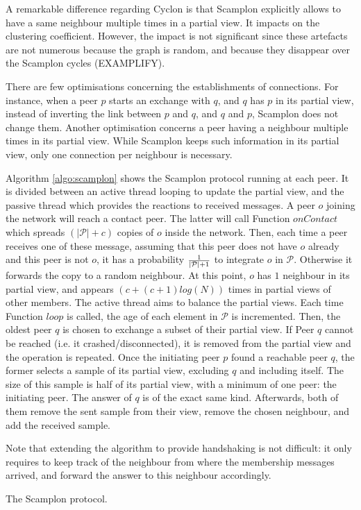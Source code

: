 A remarkable difference regarding Cyclon is that Scamplon explicitly allows to
have a same neighbour multiple times in a partial view. It impacts on the
clustering coefficient. However, the impact is not significant since these
artefacts are not numerous because the graph is random, and because they
disappear over the Scamplon cycles (EXAMPLIFY).

There are few optimisations concerning the establishments of connections. For
instance, when a peer $p$ starts an exchange with $q$, and $q$ has $p$ in its
partial view, instead of inverting the link between $p$ and $q$, and $q$ and
$p$, Scamplon does not change them. Another optimisation concerns a peer having
a neighbour multiple times in its partial view. While Scamplon keeps such
information in its partial view, only one connection per neighbour is
necessary.

\begin{asparadesc}
\item [Algorithm]\ref{algo:scamplon} shows the Scamplon protocol running at
  each peer. It is divided between an active thread looping to update the
  partial view, and the passive thread which provides the reactions to received
  messages. A peer $o$ joining the network will reach a contact peer. The
  latter will call Function $onContact$ which spreads $(|\mathcal{P}|+c)$
  copies of $o$ inside the network. Then, each time a peer receives one of
  these message, assuming that this peer does not have $o$ already and this
  peer is not $o$, it has a probability $1\over{|\mathcal{P}|+1}$ to integrate
  $o$ in $\mathcal{P}$. Otherwise it forwards the copy to a random neighbour.
  At this point, $o$ has $1$ neighbour in its partial view, and appears
  $(c+(c+1)log(N))$ times in partial views of other members. The active thread
  aims to balance the partial views. Each time Function $loop$ is called, the
  age of each element in $\mathcal{P}$ is incremented. Then, the oldest peer
  $q$ is chosen to exchange a subset of their partial view. If Peer $q$ cannot
  be reached (i.e. it crashed/disconnected), it is removed from the partial
  view and the operation is repeated. Once the initiating peer $p$ found a
  reachable peer $q$, the former selects a sample of its partial view,
  excluding $q$ and including itself. The size of this sample is half of its
  partial view, with a minimum of one peer: the initiating peer. The answer of
  $q$ is of the exact same kind. Afterwards, both of them remove the sent
  sample from their view, remove the chosen neighbour, and add the received
  sample.
\end{asparadesc}

Note that extending the algorithm to provide handshaking is not difficult: it
only requires to keep track of the neighbour from where the membership messages
arrived, and forward the answer to this neighbour accordingly.

\begin{algorithm}
  
  \caption{\label{algo:scamplon}The Scamplon protocol.}
\end{algorithm}

